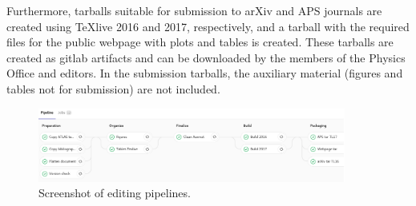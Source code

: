 Furthermore, tarballs suitable for submission to arXiv and APS journals are created using TeXlive 2016 and 2017, respectively, and a tarball with the required files for the public webpage with plots and tables is created. These tarballs are created as gitlab artifacts and can be downloaded by the members of the Physics Office and editors. In the submission tarballs, the auxiliary material (figures and tables not for submission) are not included.
\begin{figure}[ht!]
  \centering
  \includegraphics[width=0.9\textwidth]{figures/editing_pipelines_2.png}
  \caption{Screenshot of editing pipelines.}
  \label{fig:editing_pipelines_2}
\end{figure}


